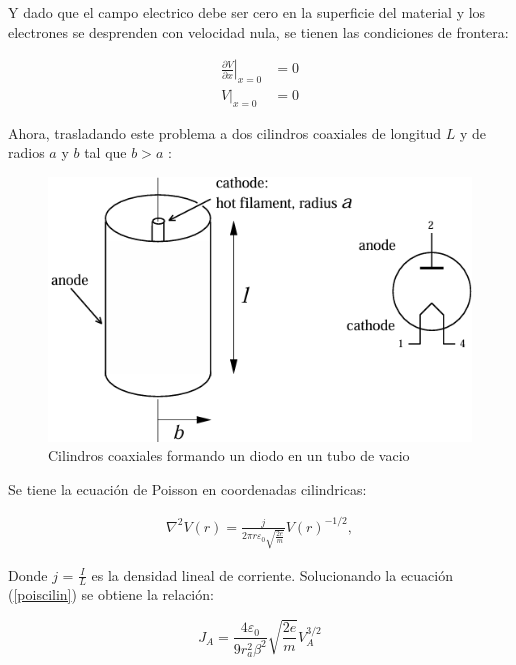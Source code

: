 \documentclass[%
 reprint,
 amsmath,amssymb,
 aps,
]{revtex4-2}
\begin{document}
\vspace{0.2 cm}
Y dado que el campo electrico debe ser cero en la superficie del material y los electrones se desprenden con velocidad nula, se tienen las condiciones de frontera:

\begin{align*}
    \left. \frac{\partial V}{\partial x}\right|_{x=0}&=0\\
        \left. V\right|_{x=0}&=0
\end{align*}

\vspace{0.2 cm}
Ahora, trasladando este problema a dos cilindros coaxiales de longitud $L$ y de radios $a$ y $b$ tal que $b>a$ :

\begin{figure}[H]
    \centering
    \includegraphics[width=0.8\linewidth]{imagenes/Cilindros.png}
    \caption{Cilindros coaxiales formando un diodo en un tubo de vacio}
    \label{fig:enter-label}
\end{figure}

\vspace{0.2 cm}
Se tiene la ecuación de Poisson en coordenadas cilindricas:

\begin{align}
    \label{poiscilin}
    \nabla^{2}V(r) = \frac{j}{2\pi r \varepsilon_{0}\sqrt{\frac{2e}{m}}} V(r)^{-1/2},
\end{align}

\vspace{0.2 cm}
Donde $j$ = $\frac{I}{L}$ es la densidad lineal de corriente. Solucionando la ecuación (\ref{poiscilin}) se obtiene la relación:

\begin{equation}
    J_{A}= \frac{4\varepsilon_{0}}{9r_{a}^{2}\beta^{2}}\sqrt{\frac{2e}{m}}V_{A}^{3/2}
    \label{eq: Ley de Child cilindrica}
\end{equation}
\end{document}
